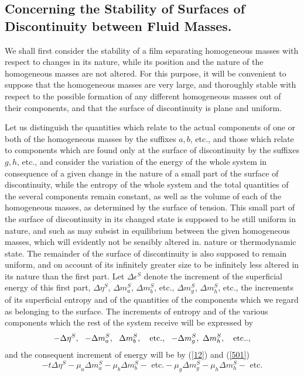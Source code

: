 \documentclass[12pt]{article}
\begin{document}
{\subsection{Concerning the Stability of Surfaces of Discontinuity between Fluid Masses.}
We shall first consider the stability of a film separating homogeneous masses with respect to changes in its nature, while its position and the nature of the homogeneous masses are not altered. For this purpose, it will be convenient to suppose that the homogeneous masses are very large, and thoroughly stable with respect to the possible formation of any different homogeneous masses out of their components, and that the surface of discontinuity is plane and uniform.

Let us distinguish the quantities which relate to the actual components of one or both of the homogeneous masses by the suffixes $a, b$, etc., and those which relate to components which are found only at the surface of discontinuity by the suffixes $g,h$,  etc., and consider the variation of the energy of the whole system in consequence of a given change in the nature of a small part of the surface of discontinuity, while the entropy of the whole system and the total quantities of the several components remain constant, as well as the volume of each of the homogeneous masses, as determined by the surface of tension. This small part of the surface of discontinuity in its changed state is supposed to be still uniform    in nature, and such as may subsist in equilibrium between the given homogeneous masses, which will evidently not be sensibly altered in. nature or thermodynamic state. The remainder of the surface of discontinuity is also supposed to remain uniform, and on account of its infinitely greater size to be infinitely less altered in its nature than the first part. Let $\Delta \epsilon^S$ denote the increment of the superficial energy of this first part, $\Delta \eta^S$, $\Delta m_a^S$, $\Delta m_b^S$, etc., $\Delta m_g^S$, $\Delta m_h^S$, etc., the increments of its superficial entropy and of the quantities of the components which we regard as belonging to the surface. The increments of entropy and of the various components which the rest of the system receive will be expressed by
$$ -\Delta \eta^S, \ \ -\Delta m_a^S,\ \ \Delta m_b^S, \ \ \text{ etc.}, \ \ -\Delta m_g^S, \ \-\Delta m_h^S, \ \ \text{ etc.}.,$$
and the consequent increment of energy will be by (\ref{12}) and (\ref{501})
$$- t \Delta \eta^S - \mu_a \Delta m_a^S - \mu_b \Delta m_b^S - \text{ etc.} -  \mu_g \Delta m_g^S - \mu_h \Delta m_h^S- \text{ etc.}$$
}
\end{document}
